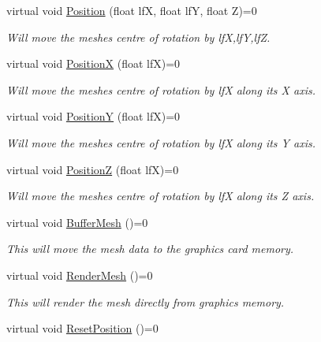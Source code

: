 \begin{DoxyCompactItemize}
virtual void \hyperlink{classv_mesh_a9a554bf498f103a80511407cbc773611}{Position} (float lfX, float lfY, float Z)=0
\begin{DoxyCompactList}\small\item\em Will move the meshes centre of rotation by lfX,lfY,lfZ. \item\end{DoxyCompactList}\item 
virtual void \hyperlink{classv_mesh_a7142dee14ef4cfcb1549cea1ea1683bd}{PositionX} (float lfX)=0
\begin{DoxyCompactList}\small\item\em Will move the meshes centre of rotation by lfX along its X axis. \item\end{DoxyCompactList}\item 
virtual void \hyperlink{classv_mesh_a4acf04a59788dfd36ed7c9aa7d7b65a6}{PositionY} (float lfX)=0
\begin{DoxyCompactList}\small\item\em Will move the meshes centre of rotation by lfX along its Y axis. \item\end{DoxyCompactList}\item 
virtual void \hyperlink{classv_mesh_a027a53a9b040178831df3db1b26b750e}{PositionZ} (float lfX)=0
\begin{DoxyCompactList}\small\item\em Will move the meshes centre of rotation by lfX along its Z axis. \item\end{DoxyCompactList}\item 
virtual void \hyperlink{classv_mesh_a1ead99a315b0ccb9731a30d9fa1150c5}{BufferMesh} ()=0
\begin{DoxyCompactList}\small\item\em This will move the mesh data to the graphics card memory. \item\end{DoxyCompactList}\item 
virtual void \hyperlink{classv_mesh_a06ed7e6fcece13d2103c20386cfeb053}{RenderMesh} ()=0
\begin{DoxyCompactList}\small\item\em This will render the mesh directly from graphics memory. \item\end{DoxyCompactList}\item 
virtual void \hyperlink{classv_mesh_ad45df1e9f8569b2d7d0c8c227fbc5ce0}{ResetPosition} ()=0

\end{DoxyCompactItemize}
